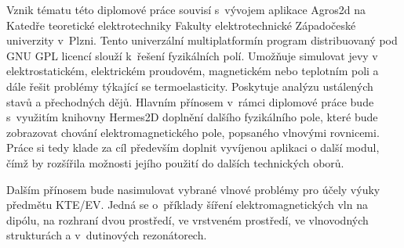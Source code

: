 Vznik tématu této diplomové práce souvisí s~vývojem aplikace Agros2d na Katedře teoretické elektrotechniky Fakulty elektrotechnické Západočeské univerzity v~Plzni. Tento univerzální multiplatformín program distribuovaný pod GNU GPL licencí slouží k~řešení fyzikálních polí. Umožňuje simulovat jevy v elektrostatickém, elektrickém proudovém, magnetickém nebo teplotním poli a dále řešit problémy týkající se termoelasticity. Poskytuje analýzu ustálených stavů a přechodných dějů.  Hlavním přínosem v~rámci diplomové práce bude s~využitím knihovny Hermes2D doplnění dalšího fyzikálního pole, které bude zobrazovat chování elektromagnetického pole, popsaného vlnovými rovnicemi. Práce si tedy klade za cíl především doplnit vyvíjenou aplikaci o další modul, čímž by rozšířila možnosti jejího použití do dalších technických oborů. 

Dalším přínosem bude nasimulovat vybrané vlnové problémy pro účely výuky předmětu KTE/EV. Jedná se o~příklady šíření elektromagnetických vln na dipólu, na rozhraní dvou prostředí, ve vrstveném prostředí, ve vlnovodných strukturách a v~dutinových rezonátorech.
